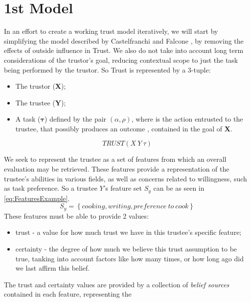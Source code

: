 \section{1st Model}
\label{sec:Model}

In an effort to create a working trust model iteratively, we will start by simplifying the model described by Castelfranchi and Falcone \cite{Castelfranchi1998}, by removing the effects of outside influence in Trust. We also do not take into account long term considerations of the trustor's goal, reducing contextual scope to just the task being performed by the trustor. So Trust is represented by a 3-tuple:

\begin{itemize}
	\item The trustor (\textbf{X});
	\item The trustee (\textbf{Y});
	\item A task ($\bm{\tau}$) defined by the pair $(\alpha, \rho)$, where \bm{$\alpha$} is the action entrusted to the trustee, that possibly produces an outcome \bm{$\rho$}, contained in the goal of \textbf{X}.
\end{itemize}
\begin{equation}
TRUST(X\ Y\ \tau)
\label{eq:TrustRelation}
\end{equation}

We seek to represent the trustee as a set of features from which an overall evaluation may be retrieved. These features provide a representation of the trustee's abilities in various fields, as well as concerns related to willingness, such as task preference. So a trustee $Y$'s feature set $ S_y $ can be as seen in \ref{eq:FeaturesExample}.
\begin{equation}
S_y=\left\{cooking, writing, preference\ to\ cook\right\}
\label{eq:FeaturesExample}
\end{equation}
These features must be able to provide 2 values:

\begin{itemize}
	\item trust - a value for how much trust we have in this trustee's specific feature;
	\item certainty - the degree of how much we believe this trust assumption to be true, tanking into account factors like how many times, or how long ago did we last affirm this belief.
\end{itemize}

The trust and certainty values are provided by a collection of \textit{belief sources} contained in each feature, representing the 

